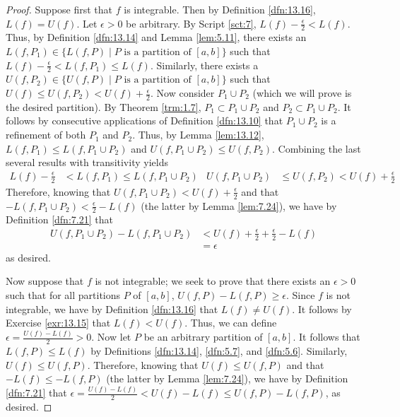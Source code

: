 \documentclass[../main.tex]{subfiles}
\begin{document}
\begin{theorem}
\begin{proof}
        Suppose first that $f$ is integrable. Then by Definition \ref{dfn:13.16}, $L(f)=U(f)$. Let $\epsilon>0$ be arbitrary. By Script \ref{sct:7}, $L(f)-\frac{\epsilon}{2}<L(f)$. Thus, by Definition \ref{dfn:13.14} and Lemma \ref{lem:5.11}, there exists an $L(f,P_1)\in\{L(f,P)\mid P\text{ is a partition of }[a,b]\}$ such that $L(f)-\frac{\epsilon}{2}<L(f,P_1)\leq L(f)$. Similarly, there exists a $U(f,P_2)\in\{U(f,P)\mid P\text{ is a partition of }[a,b]\}$ such that $U(f)\leq U(f,P_2)<U(f)+\frac{\epsilon}{2}$. Now consider $P_1\cup P_2$ (which we will prove is the desired partition). By Theorem \ref{trm:1.7}, $P_1\subset P_1\cup P_2$ and $P_2\subset P_1\cup P_2$. It follows by consecutive applications of Definition \ref{dfn:13.10} that $P_1\cup P_2$ is a refinement of both $P_1$ and $P_2$. Thus, by Lemma \ref{lem:13.12}, $L(f,P_1)\leq L(f,P_1\cup P_2)$ and $U(f,P_1\cup P_2)\leq U(f,P_2)$. Combining the last several results with transitivity yields
        \begin{align*}
            L(f)-\frac{\epsilon}{2} &< L(f,P_1) \leq L(f,P_1\cup P_2)&
            U(f,P_1\cup P_2) &\leq U(f,P_2) < U(f)+\frac{\epsilon}{2}
        \end{align*}
        Therefore, knowing that $U(f,P_1\cup P_2)<U(f)+\frac{\epsilon}{2}$ and that $-L(f,P_1\cup P_2)<\frac{\epsilon}{2}-L(f)$ (the latter by Lemma \ref{lem:7.24}), we have by Definition \ref{dfn:7.21} that
        \begin{align*}
            U(f,P_1\cup P_2)-L(f,P_1\cup P_2) &< U(f)+\frac{\epsilon}{2}+\frac{\epsilon}{2}-L(f)\\
            &= \epsilon
        \end{align*}
        as desired.\par
        Now suppose that $f$ is not integrable; we seek to prove that there exists an $\epsilon>0$ such that for all partitions $P$ of $[a,b]$, $U(f,P)-L(f,P)\geq\epsilon$. Since $f$ is not integrable, we have by Definition \ref{dfn:13.16} that $L(f)\neq U(f)$. It follows by Exercise \ref{exr:13.15} that $L(f)<U(f)$. Thus, we can define $\epsilon=\frac{U(f)-L(f)}{2}>0$. Now let $P$ be an arbitrary partition of $[a,b]$. It follows that $L(f,P)\leq L(f)$ by Definitions \ref{dfn:13.14}, \ref{dfn:5.7}, and \ref{dfn:5.6}. Similarly, $U(f)\leq U(f,P)$. Therefore, knowing that $U(f)\leq U(f,P)$ and that $-L(f)\leq -L(f,P)$ (the latter by Lemma \ref{lem:7.24}), we have by Definition \ref{dfn:7.21} that $\epsilon=\frac{U(f)-L(f)}{2}<U(f)-L(f)\leq U(f,P)-L(f,P)$, as desired.
    \end{proof}
\end{theorem}
\end{document}
